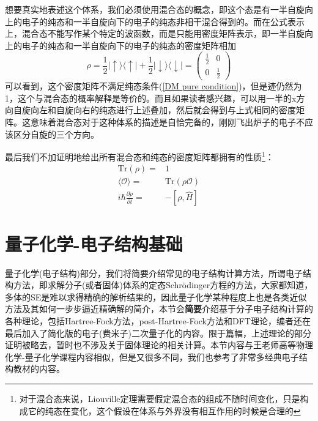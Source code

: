 \documentclass[12pt,a4paper,openany,twoside]{book}
\numberwithin{equation}{section}
\newcommand{\sch}{Schr\"odinger}
\begin{document}
        想要真实地表述这个体系，我们必须使用混合态的概念，即这个态是有一半自旋向上的电子的纯态和一半自旋向下的电子的纯态非相干混合得到的。而在公式表示上，混合态不能写作某个特定的波函数，而是只能用密度矩阵表示，即一半自旋向上的电子的纯态和一半自旋向下的电子的纯态的密度矩阵相加
        \begin{equation}
          \rho = \frac{1}{2} | \uparrow \rangle \langle \uparrow |+\frac{1}{2} | \downarrow \rangle \langle \downarrow |=\left(\begin{array}{ll}
            {\frac{1}{2}} & {0} \\
            {0} & {\frac{1}{2}}
          \end{array}\right)
        \end{equation}
        可以看到，这个密度矩阵不满足纯态条件(\ref{DM pure condition})，但是迹仍然为1，这个与混合态的概率解释是等价的。而且如果读者感兴趣，可以用一半的x方向自旋向左和自旋向右的纯态进行上述叠加，然后就会得到与上式相同的密度矩阵。这意味着混合态对于这种体系的描述是自恰完备的，刚刚飞出炉子的电子不应该区分自旋的三个方向。
        
        最后我们不加证明地给出所有混合态和纯态的密度矩阵都拥有的性质\footnote{对于混合态来说，Liouville定理需要假定混合态的组成不随时间变化，只是构成它的纯态在变化，这个假设在体系与外界没有相互作用的时候是合理的}：\\
        \begin{align*}
          \text{Tr}(\rho)=&1\\
          \langle\mathcal{O}\rangle=&\text{Tr}(\rho \mathcal{O})\\
          i \hbar \frac{\partial \rho}{\partial t}=&-[\rho,\hat{H}]
        \end{align*}
    

    \chapter{量子化学-电子结构基础}
      量子化学(电子结构)部分，我们将简要介绍常见的电子结构计算方法，所谓电子结构方法，即求解分子(或者固体)体系的定态\sch 方程的方法，大家都知道，多体的SE是难以求得精确的解析结果的，因此量子化学某种程度上也是各类近似方法及其如何一步步逼近精确解的简介，本节会\textbf{简要}介绍基于分子电子结构计算的各种理论，包括Hartree-Fock方法，post-Hartree-Fock方法和DFT理论，编者还在最后加入了简化版的电子(费米子)二次量子化的内容。限于篇幅，上述理论的部分证明被略去，暂时也不涉及关于固体理论的相关计算。本节内容与王老师高等物理化学-量子化学课程内容相似，但是又很多不同，我们也参考了非常多经典电子结构教材的内容。
      
\end{document}

